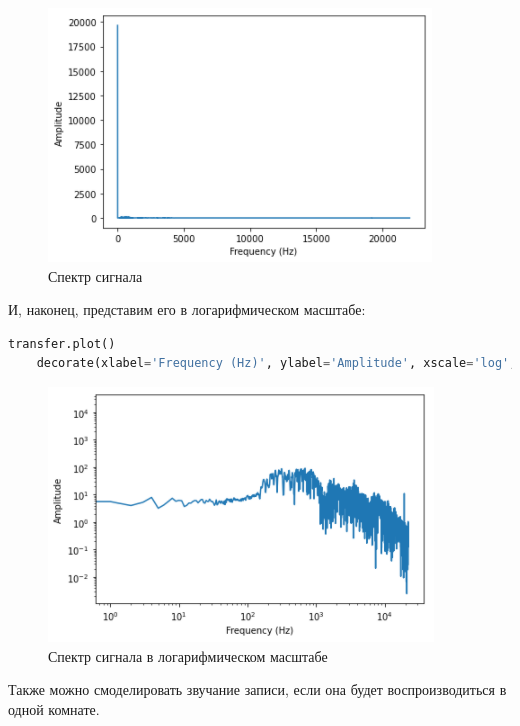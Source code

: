 \documentclass[a4paper]{article}
\begin{document}
            \begin{figure}[H]
                \centering
                \includegraphics{ex_2_2.png}
                \caption{Спектр сигнала}
                \label{fig:ex_2_2}
            \end{figure}
            
            И, наконец, представим его в логарифмическом масштабе:
            
\begin{lstlisting}[language=Python, caption= Получение спектра сигнала в логарифмическом масштабе]
    transfer.plot()
    decorate(xlabel='Frequency (Hz)', ylabel='Amplitude', xscale='log', yscale='log')
\end{lstlisting}
            
            \begin{figure}[H]
                \centering
                \includegraphics{ex_2_3.png}
                \caption{Спектр сигнала в логарифмическом масштабе}
                \label{fig:ex_2_3}
            \end{figure}
            
            Также можно смоделировать звучание записи, если она будет воспроизводиться в одной комнате.
            
\end{document}
